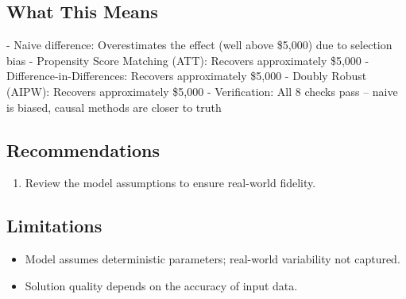 \documentclass[11pt, a4paper]{article}
\begin{document}
\subsection{What This Means}

- Naive difference: Overestimates the effect (well above \$5,000) due to selection bias
- Propensity Score Matching (ATT): Recovers approximately \$5,000
- Difference-in-Differences: Recovers approximately \$5,000
- Doubly Robust (AIPW): Recovers approximately \$5,000
- Verification: All 8 checks pass -- naive is biased, causal methods are closer to truth



\subsection{Recommendations}

\begin{enumerate}
  \item Review the model assumptions to ensure real-world fidelity.
\end{enumerate}

\subsection{Limitations}

\begin{polyawarnbox}
\begin{itemize}
  \item Model assumes deterministic parameters; real-world variability not captured.
  \item Solution quality depends on the accuracy of input data.
\end{itemize}
\end{polyawarnbox}

\end{document}
